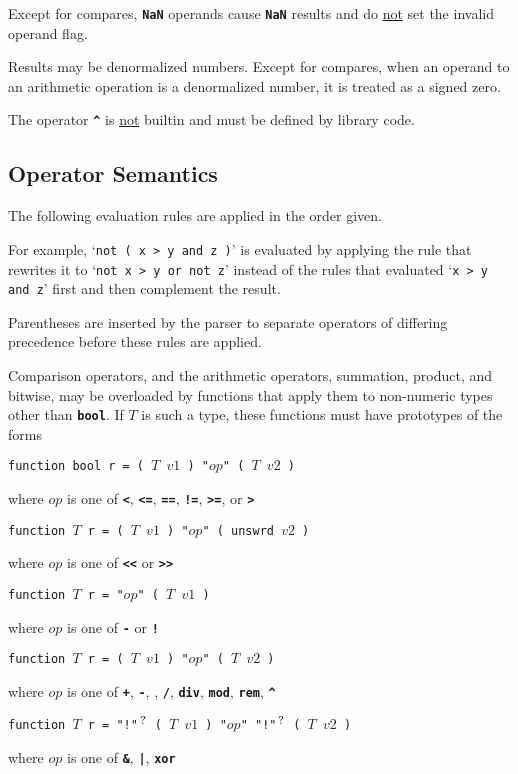 \documentclass[12pt]{article}
\newcommand{\TT}[1]{{\tt \bfseries #1}}
\newcommand{\QMARK}{{$^{\,\mbox{\footnotesize ?}}$}}
\newenvironment{indpar}[1][0.3in]%
	{\begin{list}{}%
		     {\setlength{\itemsep}{0in}%
		      \setlength{\topsep}{0in}%
		      \setlength{\parsep}{1ex}%
		      \setlength{\labelwidth}{#1}%
		      \setlength{\leftmargin}{#1}%
		      \addtolength{\leftmargin}{\labelsep}}%
	 \item}%
	{\end{list}}
\begin{document}
Except for compares, \TT{NaN} operands cause \TT{NaN} results and
do \underline{not} set the invalid operand flag.

Results may be denormalized numbers.  Except for compares,
when an operand to an arithmetic operation is a denormalized
number, it is treated as a signed zero.

The operator
\TT{\textasciicircum} is \underline{not} builtin and must be
defined by library code.

\subsection{Operator Semantics}

The following evaluation rules are applied in the order given.

For example, `{\tt not ( x > y and z )}' is evaluated by applying
the rule that rewrites it to `{\tt not x > y or not z}' instead of
the rules that evaluated `{\tt x > y and z}' first and then complement
the result.

Parentheses are inserted by the parser to separate operators of
differing precedence before these rules are applied.

Comparison operators, and the
arithmetic operators, summation, product, and bitwise, 
may be overloaded by functions that apply them to non-numeric
types other than \TT{bool}.
If $T$ is such a type, these functions must have prototypes
of the forms
\begin{indpar}
{\tt function bool r = ( $T$ $v1$ ) "$op$" ( $T$ $v2$ )}
\begin{indpar}
where $op$ is one of \TT{<}, \TT{<=}, \TT{==}, \TT{!=}, \TT{>=}, or \TT{>}
\end{indpar}

{\tt function $T$ r = ( $T$ $v1$ ) "$op$" ( unswrd $v2$ )}
\begin{indpar}
where $op$ is one of \TT{<{}<} or \TT{>{}>}
\end{indpar}

{\tt function $T$ r = "$op$" ( $T$ $v1$ )}
\begin{indpar}
where $op$ is one of \TT{-} or \TT{!}
\end{indpar}

{\tt function $T$ r = ( $T$ $v1$ ) "$op$" ( $T$ $v2$ )}
\begin{indpar}
where $op$ is one of
    \TT{+}, \TT{-},
    \TT{*}, \TT{/}, \TT{div}, \TT{mod}, \TT{rem}, \TT{\textasciicircum}
\end{indpar}

{\tt function $T$ r = "!"\QMARK{} ( $T$ $v1$ ) "$op$" "!"\QMARK{} ( $T$ $v2$ )}
\begin{indpar}
where $op$ is one of
    \TT{\&}, \TT{|}, \TT{xor}
\end{indpar}

\end{indpar}
\end{document}
